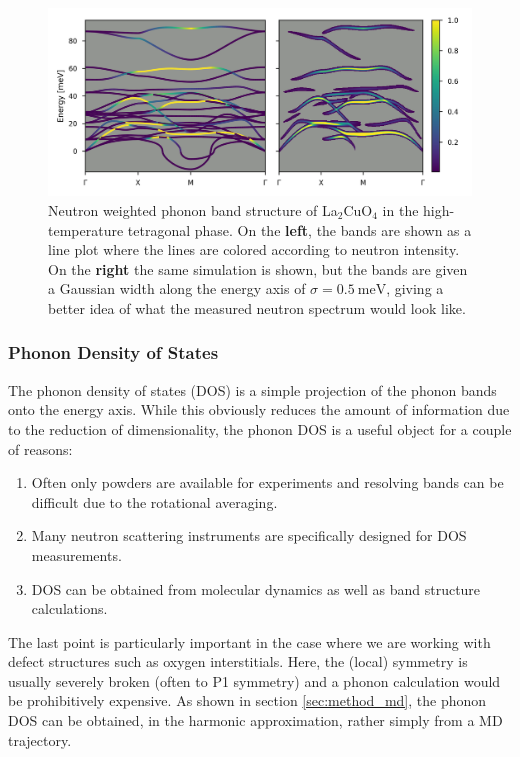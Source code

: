 \begin{figure}
	\centering
	\includegraphics[width=\textwidth]{fig/method/colorbands_example.png}
	\caption[Neutron weighted bands example]{Neutron weighted phonon band structure of La$_2$CuO$_4$ in the high-temperature tetragonal phase. On the \textbf{left}, the bands are shown as a line plot where the lines are colored according to neutron intensity. On the \textbf{right} the same simulation is shown, but the bands are given a Gaussian width along the energy axis of $\sigma = \SI{0.5}{\milli\eV}$, giving a better idea of what the measured neutron spectrum would look like.}
	\label{fig:bands_sqw_color_line}
\end{figure}

\subsubsection{Phonon Density of States}
The phonon density of states (DOS) is a simple projection of the phonon bands onto the energy axis. While this obviously reduces the amount of information due to the reduction of dimensionality, the phonon DOS is a useful object for a couple of reasons:

\begin{enumerate}
	\item Often only powders are available for experiments and resolving bands can be difficult due to the rotational averaging.
	\item Many neutron scattering instruments are specifically designed for DOS measurements.
	\item DOS can be obtained from molecular dynamics as well as band structure calculations.
\end{enumerate}

\noindent The last point is particularly important in the case where we are working with defect structures such as oxygen interstitials. Here, the (local) symmetry is usually severely broken (often to P1 symmetry) and a phonon calculation would be prohibitively expensive. As shown in section \ref{sec:method_md}, the phonon DOS can be obtained, in the harmonic approximation, rather simply from a MD trajectory.

